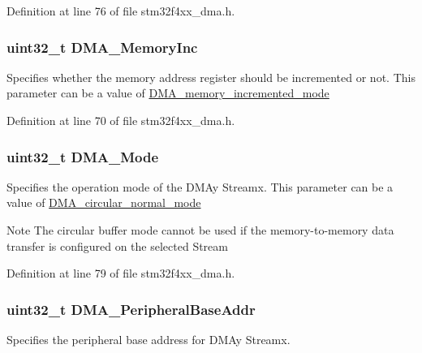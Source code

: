 Definition at line 76 of file stm32f4xx\-\_\-dma.\-h.

\hypertarget{struct_d_m_a___init_type_def_ad8f8a0f3ba4db5d79fd78d02093e4eb9}{
\subsubsection[{D\-M\-A\-\_\-\-Memory\-Inc}]{\setlength{\rightskip}{0pt plus 5cm}uint32\-\_\-t D\-M\-A\-\_\-\-Memory\-Inc}}\label{struct_d_m_a___init_type_def_ad8f8a0f3ba4db5d79fd78d02093e4eb9}
Specifies whether the memory address register should be incremented or not. This parameter can be a value of \hyperlink{group___d_m_a__memory__incremented__mode}{D\-M\-A\-\_\-memory\-\_\-incremented\-\_\-mode} 

Definition at line 70 of file stm32f4xx\-\_\-dma.\-h.

\hypertarget{struct_d_m_a___init_type_def_a5f09c16a03a50120c1a1a49ae6a7c667}{
\subsubsection[{D\-M\-A\-\_\-\-Mode}]{\setlength{\rightskip}{0pt plus 5cm}uint32\-\_\-t D\-M\-A\-\_\-\-Mode}}\label{struct_d_m_a___init_type_def_a5f09c16a03a50120c1a1a49ae6a7c667}
Specifies the operation mode of the D\-M\-Ay Streamx. This parameter can be a value of \hyperlink{group___d_m_a__circular__normal__mode}{D\-M\-A\-\_\-circular\-\_\-normal\-\_\-mode} \begin{DoxyNote}{Note}
The circular buffer mode cannot be used if the memory-\/to-\/memory data transfer is configured on the selected Stream 
\end{DoxyNote}


Definition at line 79 of file stm32f4xx\-\_\-dma.\-h.

\hypertarget{struct_d_m_a___init_type_def_ad02abd574cca0caeacd0cc05d2174a42}{
\subsubsection[{D\-M\-A\-\_\-\-Peripheral\-Base\-Addr}]{\setlength{\rightskip}{0pt plus 5cm}uint32\-\_\-t D\-M\-A\-\_\-\-Peripheral\-Base\-Addr}}\label{struct_d_m_a___init_type_def_ad02abd574cca0caeacd0cc05d2174a42}
Specifies the peripheral base address for D\-M\-Ay Streamx. 

